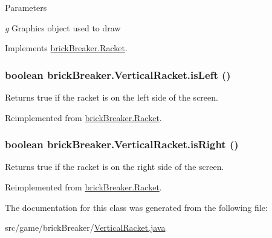 \begin{DoxyParams}{Parameters}
\item[{\em g}]Graphics object used to draw \end{DoxyParams}


Implements \hyperlink{classbrick_breaker_1_1_racket_a6ca0308def67e0955522a0e0beb430e9}{brickBreaker.Racket}.

\hypertarget{classbrick_breaker_1_1_vertical_racket_aa1af985933bd997bba1951e38107a5a5}{
\subsubsection[{isLeft}]{\setlength{\rightskip}{0pt plus 5cm}boolean brickBreaker.VerticalRacket.isLeft ()}}
\label{classbrick_breaker_1_1_vertical_racket_aa1af985933bd997bba1951e38107a5a5}
Returns true if the racket is on the left side of the screen. 

Reimplemented from \hyperlink{classbrick_breaker_1_1_racket_af8ef3d348dca4cc1daad627826baea56}{brickBreaker.Racket}.

\hypertarget{classbrick_breaker_1_1_vertical_racket_ad8c73b81712009be68fa497c48b71012}{
\subsubsection[{isRight}]{\setlength{\rightskip}{0pt plus 5cm}boolean brickBreaker.VerticalRacket.isRight ()}}
\label{classbrick_breaker_1_1_vertical_racket_ad8c73b81712009be68fa497c48b71012}
Returns true if the racket is on the right side of the screen. 

Reimplemented from \hyperlink{classbrick_breaker_1_1_racket_ad1d76aea1bd7dea3c4114c8c585150ed}{brickBreaker.Racket}.



The documentation for this class was generated from the following file:\begin{DoxyCompactItemize}
\item 
src/game/brickBreaker/\hyperlink{_vertical_racket_8java}{VerticalRacket.java}\end{DoxyCompactItemize}
